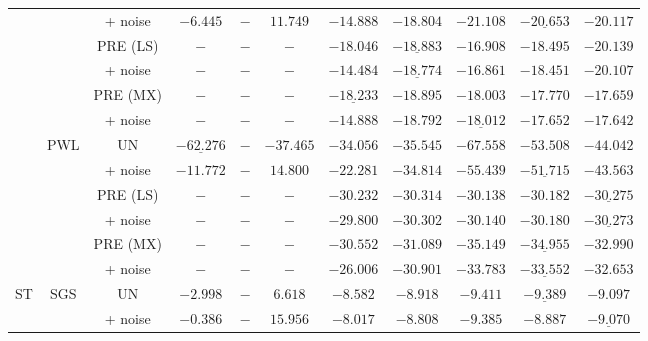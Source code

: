 \begin{table}[!t]
\begin{minipage}{1\textwidth}
\begin{tabular}{ccccccccccc}
                    && + noise
                    & $-6.445$  & $-$ & $11.749$ & $-14.888$ & $-18.804$ & $\mathbf{-21.108}$ & $\underline{-20.653}$ & $-20.117$  \\ 
                    && PRE (LS)
                    & $-$ & $-$ & $-$ & $-18.046$ & $\underline{-18.883}$ & $-16.908$ & $-18.495$ & $\mathbf{-20.139}$  \\
                    && + noise
                    & $-$ & $-$ & $-$ & $-14.484$ & $\underline{-18.774}$ & $-16.861$ & $-18.451$ & $\mathbf{-20.107}$  \\ 
                    && PRE (MX)
                    & $-$ & $-$ & $-$ & $\underline{-18.233}$ & $\mathbf{-18.895}$ & $-18.003$ & $-17.770$ & $-17.659$  \\
                    && + noise
                    & $-$ & $-$ & $-$ & $-14.888$ & $\mathbf{-18.792}$ & $\underline{-18.012}$ & $-17.652$ & $-17.642$  \\ 
            \cmidrule(lr){2-11}
            & \multirow{6}{*}{PWL}
                    & UN
                    & $\underline{-62.276}$  & $-$ & $-37.465$ & $-34.056$ & $-35.545$ & $\mathbf{-67.558}$ & $-53.508$ & $-44.042$  \\
                    && + noise
                    & $-11.772$  & $-$ & $14.800$ & $-22.281$ & $-34.814$ & $\mathbf{-55.439}$ & $\underline{-51.715}$ & $-43.563$  \\ 
                    && PRE (LS)
                    & $-$ & $-$ & $-$ & $-30.232$ & $\mathbf{-30.314}$ & $-30.138$ & $-30.182$ & $\underline{-30.275}$  \\
                    && + noise
                    & $-$ & $-$ & $-$ & $-29.800$ & $\mathbf{-30.302}$ & $-30.140$ & $-30.180$ & $\underline{-30.273}$  \\
                    && PRE (MX)
                    & $-$ & $-$ & $-$ & $-30.552$ & $-31.089$ & $\mathbf{-35.149}$ & $\underline{-34.955}$ & $-32.990$  \\
                    && + noise
                    & $-$ & $-$ & $-$ & $-26.006$ & $-30.901$ & $\mathbf{-33.783}$ & $\underline{-33.552}$ & $-32.653$  \\ 
            \midrule
            \multirow{4}{*}{ST}
                & \multirow{4}{*}{SGS}
                    & UN
                    & $-2.998$  & $-$ & $6.618$ & $-8.582$ & $-8.918$ & $\mathbf{-9.411}$ & $\underline{-9.389}$ & $-9.097$  \\
                    && + noise
                    & $-0.386$  & $-$ & $15.956$ & $-8.017$ & $-8.808$ & $\mathbf{-9.385}$ & $-8.887$ & $\underline{-9.070}$  \\ 

\end{tabular}
\end{minipage}
\end{table}
